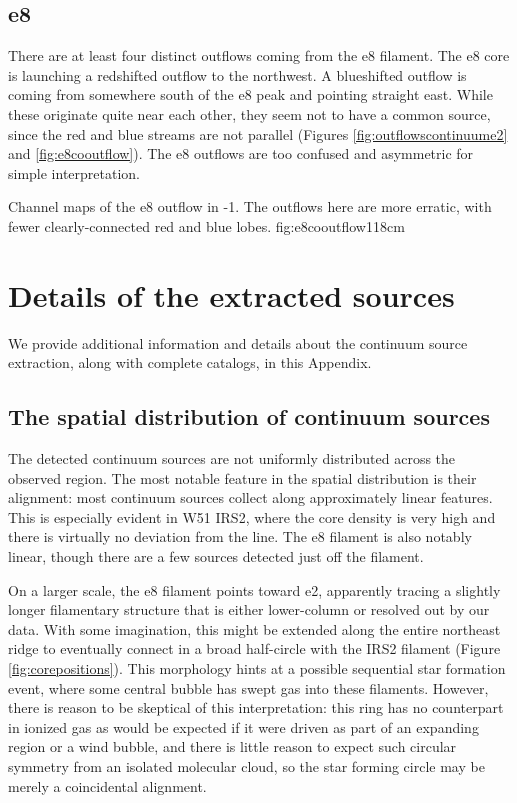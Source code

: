 \documentclass{emulateapj}
\begin{document}
\subsection{e8}
There are at least four distinct outflows coming from the e8 filament.
The e8 core is launching a redshifted outflow to the northwest.  A blueshifted
outflow is coming from somewhere south of the e8 peak and pointing straight
east.  While these originate quite near each other, they seem not to have
a common source, since the red and blue streams are not parallel (Figures
\ref{fig:outflowscontinuume2} and \ref{fig:e8cooutflow}).  The e8 outflows are too
confused and asymmetric for simple interpretation.


{Channel maps of the e8 outflow in -1.  The outflows here are more
erratic, with fewer clearly-connected red and blue lobes.}
{fig:e8cooutflow}{1}{18cm}

\section{Details of the extracted sources}
\label{sec:contsrcs}
We provide additional information and details about the continuum
source extraction, along with complete catalogs, in this Appendix.

\subsection{The spatial distribution of continuum sources}
\label{sec:corespatialdistribution}
The detected continuum sources are not uniformly distributed across the
observed region.  The most notable feature in the spatial distribution is their
alignment: most continuum sources collect along approximately linear features.
This is especially evident in W51 IRS2, where the core density is very high and
there is virtually no deviation from the line.  The e8 filament is also notably
linear, though there are a few sources detected just off the filament. 

On a larger scale, the e8 filament points toward e2, apparently tracing a
slightly longer filamentary structure that is either lower-column or resolved
out by our data.  With some imagination, this might be extended along the
entire northeast ridge to eventually connect in a broad half-circle with the
IRS2 filament (Figure \ref{fig:corepositions}).  This morphology hints at a
possible sequential star formation event, where some central bubble has swept
gas into these filaments.  However, there is reason to be skeptical of this
interpretation: this ring has no counterpart in ionized gas as would be
expected if it were driven as part of an expanding \hii region or a wind
bubble, and there is little reason to expect such circular symmetry from an
isolated molecular cloud, so the star forming circle may be merely a
coincidental alignment.
\end{document}
